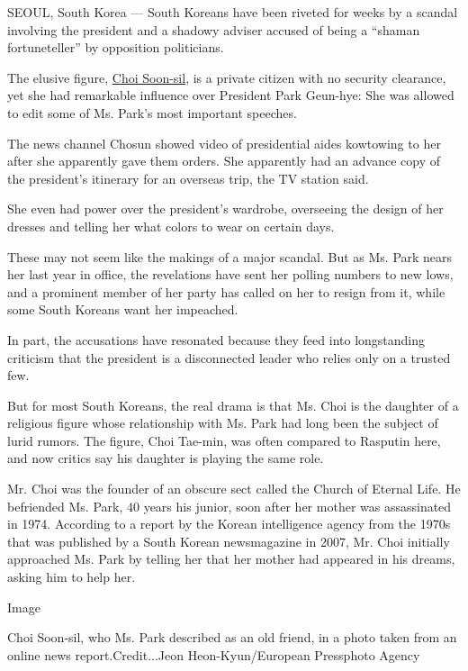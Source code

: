 SEOUL, South Korea --- South Koreans have been riveted for weeks by a
scandal involving the president and a shadowy adviser accused of being a
``shaman fortuneteller'' by opposition politicians.

The elusive figure,
\href{http://news.naver.com/main/read.nhn?mode=LSD\&mid=sec\&sid1=103\&oid=144\&aid=0000457447}{Choi
Soon-sil}, is a private citizen with no security clearance, yet she had
remarkable influence over President Park Geun-hye: She was allowed to
edit some of Ms. Park's most important speeches.

The news channel Chosun showed video of presidential aides kowtowing to
her after she apparently gave them orders. She apparently had an advance
copy of the president's itinerary for an overseas trip, the TV station
said.

She even had power over the president's wardrobe, overseeing the design
of her dresses and telling her what colors to wear on certain days.

These may not seem like the makings of a major scandal. But as Ms. Park
nears her last year in office, the revelations have sent her polling
numbers to new lows, and a prominent member of her party has called on
her to resign from it, while some South Koreans want her impeached.

In part, the accusations have resonated because they feed into
longstanding criticism that the president is a disconnected leader who
relies only on a trusted few.

But for most South Koreans, the real drama is that Ms. Choi is the
daughter of a religious figure whose relationship with Ms. Park had long
been the subject of lurid rumors. The figure, Choi Tae-min, was often
compared to Rasputin here, and now critics say his daughter is playing
the same role.

Mr. Choi was the founder of an obscure sect called the Church of Eternal
Life. He befriended Ms. Park, 40 years his junior, soon after her mother
was assassinated in 1974. According to a report by the Korean
intelligence agency from the 1970s that was published by a South Korean
newsmagazine in 2007, Mr. Choi initially approached Ms. Park by telling
her that her mother had appeared in his dreams, asking him to help her.

Image

Choi Soon-sil, who Ms. Park described as an old friend, in a photo taken
from an online news report.Credit...Jeon Heon-Kyun/European Pressphoto
Agency

